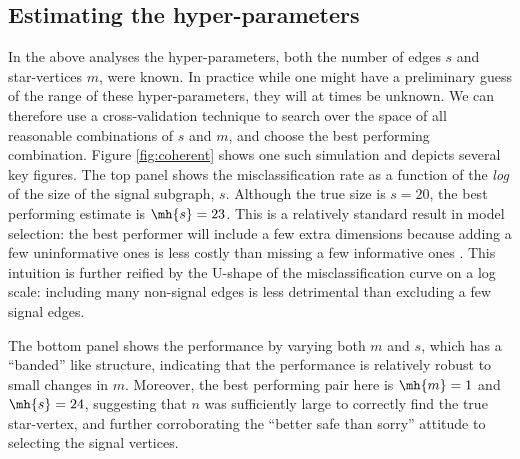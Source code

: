 \documentclass[10pt,journal,cspaper,compsoc]{IEEEtran}
\begin{document}
\subsection{Estimating the hyper-parameters} %
\label{sub:estimating_the_hyper_parameters}

In the above analyses the hyper-parameters, both the number of edges $s$ and star-vertices $m$, were known.  In practice while one might have a preliminary guess of the range of these hyper-parameters, they will at times be unknown.  We can therefore use a cross-validation technique to search over the space of all reasonable combinations of $s$ and $m$, and choose the best performing combination.  Figure \ref{fig:coherent} shows one such simulation and depicts several key figures.  The top panel shows the misclassification rate as a function of the \emph{log} of the size of the signal subgraph, $s$.  Although the true size is $s=20$, the best performing estimate is $\mh{s}=23$. This is a relatively standard result in model selection: the best performer will include a few extra dimensions because adding a few uninformative ones is less costly than missing a few informative ones \cite{}.  This intuition is further reified by the U-shape of the misclassification curve on a log scale: including many non-signal edges is less detrimental than excluding a few signal edges.

The bottom panel shows the performance by varying both $m$ and $s$, which has a ``banded'' like structure, indicating that the performance is relatively robust to small changes in $m$.  Moreover, the best performing pair here is $\mh{m}=1$ and $\mh{s}=24$, suggesting that $n$ was sufficiently large to correctly find the true star-vertex, and further corroborating the ``better safe than sorry'' attitude to selecting the signal vertices. 
\end{document}
